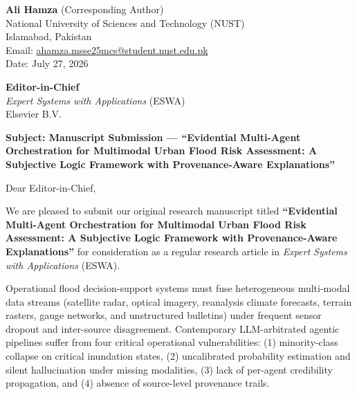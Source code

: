 \documentclass[11pt,a4paper]{article}
\begin{document}
\thispagestyle{empty}

\begin{flushleft}
\textbf{Ali Hamza} (Corresponding Author) \\
National University of Sciences and Technology (NUST) \\
Islamabad, Pakistan \\
Email: \href{mailto:ahamza.msse25mcs@student.nust.edu.pk}{ahamza.msse25mcs@student.nust.edu.pk} \\
Date: July 27, 2026
\end{flushleft}

\vspace{1.2em}

\begin{flushleft}
\textbf{Editor-in-Chief} \\
\textit{Expert Systems with Applications} (ESWA) \\
Elsevier B.V.
\end{flushleft}

\vspace{1.2em}

\noindent \textbf{Subject: Manuscript Submission — ``Evidential Multi-Agent Orchestration for Multimodal Urban Flood Risk Assessment: A Subjective Logic Framework with Provenance-Aware Explanations''}

\vspace{0.8em}

\noindent Dear Editor-in-Chief,

\vspace{0.6em}

\noindent We are pleased to submit our original research manuscript titled \textbf{``Evidential Multi-Agent Orchestration for Multimodal Urban Flood Risk Assessment: A Subjective Logic Framework with Provenance-Aware Explanations''} for consideration as a regular research article in \textit{Expert Systems with Applications} (ESWA).

\vspace{0.6em}

\noindent Operational flood decision-support systems must fuse heterogeneous multi-modal data streams (satellite radar, optical imagery, reanalysis climate forecasts, terrain rasters, gauge networks, and unstructured bulletins) under frequent sensor dropout and inter-source disagreement. Contemporary LLM-arbitrated agentic pipelines suffer from four critical operational vulnerabilities: (1) minority-class collapse on critical inundation states, (2) uncalibrated probability estimation and silent hallucination under missing modalities, (3) lack of per-agent credibility propagation, and (4) absence of source-level provenance trails.
\end{document}
